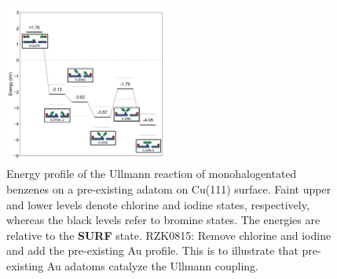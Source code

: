 \documentclass[aps,prb,reprint,amsmath,amssymb]{revtex4-1}
\newcommand{\comm}{\color{green}} %
\begin{document}
\begin{figure}[hbt]
\centering
\includegraphics[width=0.48\textwidth]{Fig/ullmann_adatom.pdf}
\caption{Energy profile of the Ullmann reaction of monohalogentated benzenes on a pre-existing adatom on Cu(111) surface. Faint upper and lower levels denote chlorine and iodine states, respectively, whereas the black levels refer to bromine states. The energies are relative to the \textbf{SURF} state. \comm RZK0815: Remove chlorine and iodine and add the pre-existing Au profile. This is to illustrate that pre-existing Au adatoms catalyze the Ullmann coupling.} 
\label{fig:adatomullmann}
\end{figure}
\end{document}
